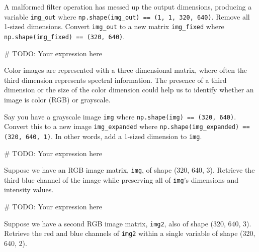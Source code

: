 \documentclass{csci1430}
\begin{document}
\pagebreak

\begin{subquestion}[points=1]
A malformed filter operation has messed up the output dimensions, producing a variable \texttt{img\_out} where \texttt{np.shape(img\_out) == (1, 1, 320, 640)}. Remove all 1-sized dimensions. Convert \texttt{img\_out} to a new matrix \texttt{img\_fixed} where \texttt{np.shape(img\_fixed) == (320, 640)}.
\end{subquestion}

\begin{answer}
\begin{python}
# TODO: Your expression here
\end{python}
\end{answer}

Color images are represented with a three dimensional matrix, where often the third dimension represents spectral information. The presence of a third dimension or the size of the color dimension could help us to identify whether an image is color (RGB) or grayscale.

\begin{subquestion}[points=1]
Say you have a grayscale image \texttt{img} where \texttt{np.shape(img) == (320, 640)}. Convert this to a new image \texttt{img\_expanded} where \texttt{np.shape(img\_expanded) == (320, 640, 1)}. In other words, add a 1-sized dimension to \texttt{img}.
\end{subquestion}

\begin{answer}
\begin{python}
# TODO: Your expression here
\end{python}
\end{answer}
    
\begin{subquestion}[points=1]
Suppose we have an RGB image matrix, \texttt{img}, of shape (320, 640, 3). Retrieve the third blue channel of the image while preserving all of \texttt{img}'s dimensions and intensity values.
\end{subquestion}
    
\begin{answer}
\begin{python}
# TODO: Your expression here
\end{python}
\end{answer}

\pagebreak

\begin{subquestion}[points=1]
Suppose we have a second RGB image matrix, \texttt{img2}, also of shape (320, 640, 3). Retrieve the red and blue channels of \texttt{img2} within a single variable of shape (320, 640, 2).
\end{subquestion}
    
\end{document}
